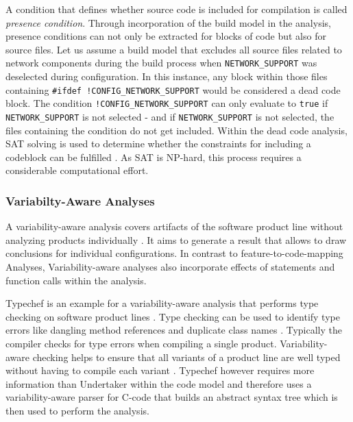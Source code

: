 \documentclass[a4paper]{article}
\begin{document}
A condition that defines whether source code is included for compilation is called \emph{presence condition}. Through incorporation of the build model in the analysis, presence conditions can not only be extracted for blocks of code but also for source files. Let us assume a build model that excludes all source files related to network components during the build process when \texttt{NETWORK\_SUPPORT} was deselected during configuration. In this instance, any block within those files containing \texttt{\#ifdef !CONFIG\_NETWORK\_SUPPORT} would be considered a dead code block. The condition \texttt{!CONFIG\_NETWORK\_SUPPORT} can only evaluate to \texttt{true} if \texttt{NETWORK\_SUPPORT} is not selected - and if \texttt{NETWORK\_SUPPORT} is not selected, the files containing the condition do not get included. Within the dead code analysis, SAT solving is used to determine whether the constraints for including a codeblock can be fulfilled \cite{Tartler:2011:FCC:1966445.1966451}. As SAT is NP-hard, this process requires a considerable computational effort.

\subsubsection{Variabilty-Aware Analyses}

A variability-aware analysis covers artifacts of the software product line without analyzing products individually \cite[p.261]{Apel:2013:FSP:2541773}. It aims to generate a result that allows to draw conclusions for individual configurations. In contrast to feature-to-code-mapping Analyses, Variability-aware analyses also incorporate effects of statements and function calls within the analysis.

Typechef is an example for a variability-aware analysis that performs type checking on software product lines \cite{Dietrich:2012:RAV:2362536.2362544}. Type checking can be used to identify type errors like dangling method references and duplicate class names \cite{Thum:2014:CSA:2620784.2580950}. Typically the compiler checks for type errors when compiling a single product.  Variability-aware  checking helps to ensure that all variants of a product line are well typed without having to compile each variant \cite{Kenner:2010:TTT:1868688.1868693}. Typechef however requires more information than Undertaker within the code model and therefore uses a variability-aware parser for C-code that builds an abstract syntax tree which is then used to perform the analysis.
\end{document}
